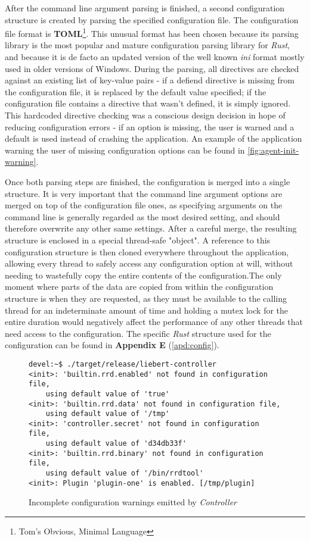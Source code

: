         After the command line argument parsing is finished, a second configuration structure is created by parsing the specified configuration file. The configuration file format is \textbf{TOML}\footnote{Tom's Obvious, Minimal Language}. This unusual format has been chosen because its parsing library is the most popular and mature configuration parsing library for \textit{Rust}, and because it is de facto an updated version of the well known \textit{ini} format mostly used in older versions of Windows. During the parsing, all directives are checked against an existing list of key-value pairs - if a defiend directive is missing from the configuration file, it is replaced by the default value specified; if the configuration file contains a directive that wasn't defined, it is simply ignored. This hardcoded directive checking was a conscious design decision in hope of reducing configuration errors - if an option is missing, the user is warned and a default is used instead of crashing the application. An example of the application warning the user of missing configuration options can be found in \autoref{fig:agent-init-warning}.
        
        Once both parsing steps are finished, the configuration is merged into a single structure. It is very important that the command line argument options are merged on top of the configuration file ones, as specifying arguments on the command line is generally regarded as the most desired setting, and should therefore overwrite any other same settings. After a careful merge, the resulting structure is enclosed in a special thread-safe "object". A reference to this configuration structure is then cloned everywhere throughout the application, allowing every thread to safely access any configuration option at will, without needing to wastefully copy the entire contents of the configuration.The only moment where parts of the data are copied from within the configuration structure is when they are requested, as they must be available to the calling thread for an indeterminate amount of time and holding a mutex lock for the entire duration would negatively affect the performance of any other threads that need access to the configuration. The specific \textit{Rust} structure used for the configuration can be found in \textbf{Appendix E} (\autoref{apd:config}).
        
        \begin{figure}[!htb]
            \centering
            \begin{BVerbatim}
devel:~$ ./target/release/liebert-controller
<init>: 'builtin.rrd.enabled' not found in configuration file,
    using default value of 'true'
<init>: 'builtin.rrd.data' not found in configuration file,
    using default value of '/tmp'
<init>: 'controller.secret' not found in configuration file,
    using default value of 'd34db33f'
<init>: 'builtin.rrd.binary' not found in configuration file,
    using default value of '/bin/rrdtool'
<init>: Plugin 'plugin-one' is enabled. [/tmp/plugin]
            \end{BVerbatim}
            \caption{Incomplete configuration warnings emitted by \textit{Controller}}
            \label{fig:agent-init-warning}
        \end{figure}
        
